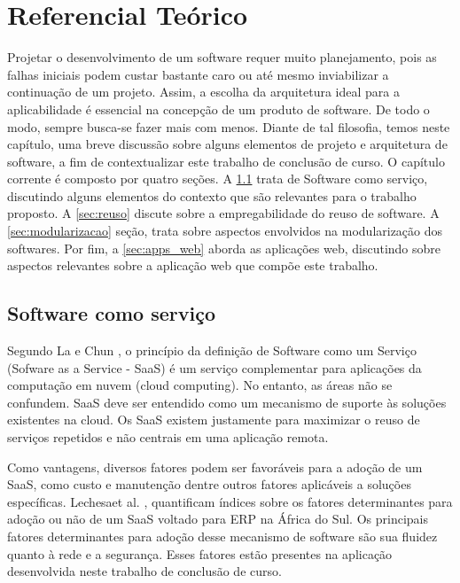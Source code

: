 \chapter{Referencial Teórico}


Projetar o desenvolvimento de um software requer muito planejamento, pois as falhas iniciais podem custar bastante caro ou até mesmo inviabilizar a continuação de um projeto. Assim, a escolha da arquitetura ideal para a aplicabilidade é essencial na concepção de um produto de software. 
De todo o modo, sempre busca-se fazer mais com menos. Diante de tal filosofia, temos neste capítulo, uma breve discussão sobre alguns elementos de projeto e arquitetura de software, a fim de contextualizar este trabalho de conclusão de curso.
O capítulo corrente é composto por quatro seções. A \ref{sec:saas} trata de Software como serviço, discutindo alguns elementos do contexto que são relevantes para o trabalho proposto. A \ref{sec:reuso}  discute sobre a empregabilidade do reuso de software. A \ref{sec:modularizacao} seção, trata sobre aspectos envolvidos na modularização dos softwares. Por fim, a \ref{sec:apps_web} aborda as aplicações web, discutindo sobre aspectos relevantes sobre a aplicação web que compõe este trabalho.


 \section{Software como serviço}\label{sec:saas}


Segundo La e Chun \citep{La2009Systematic}, o princípio da definição de Software como um Serviço (Sofware as a Service - SaaS) é um serviço complementar para aplicações da computação em nuvem (cloud computing). No entanto, as áreas não se confundem. SaaS deve ser entendido como um mecanismo de suporte às soluções existentes na cloud. Os SaaS existem justamente para maximizar o reuso de serviços repetidos e não centrais em uma aplicação remota.


Como vantagens, diversos fatores podem ser favoráveis para a adoção de um SaaS, como custo e manutenção dentre outros fatores aplicáveis a soluções específicas. Lechesaet al. \citep{LechesaSS11}, quantificam índices sobre os fatores determinantes para adoção ou não de um SaaS voltado para ERP na África do Sul. Os principais fatores determinantes para adoção desse mecanismo de software são sua fluidez quanto à rede e a segurança. Esses fatores estão presentes na aplicação desenvolvida neste trabalho de conclusão de curso.


